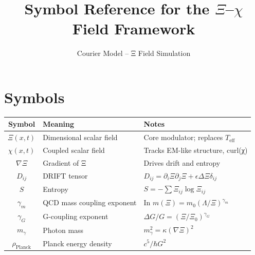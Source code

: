 \documentclass{article}
\begin{document}
\title{Symbol Reference for the $\Xi$--$\chi$ Field Framework}
\author{Courier Model – Ξ Field Simulation}
\maketitle

\section*{Symbols}

\begin{tabular}{|c|l|l|}
\hline
\textbf{Symbol} & \textbf{Meaning} & \textbf{Notes} \\
\hline
$\Xi(x,t)$ & Dimensional scalar field & Core modulator; replaces $T_{\text{eff}}$ \\
$\chi(x,t)$ & Coupled scalar field & Tracks EM-like structure, curl(χ) \\
$\nabla \Xi$ & Gradient of Ξ & Drives drift and entropy \\
$D_{ij}$ & DRIFT tensor & $D_{ij} = \partial_i \Xi \partial_j \Xi + \epsilon \Delta \Xi \delta_{ij}$ \\
$S$ & Entropy & $S = - \sum \Xi_{ij} \log \Xi_{ij}$ \\
$\gamma_m$ & QCD mass coupling exponent & In $m(\Xi) = m_0 (\Lambda/\Xi)^{\gamma_m}$ \\
$\gamma_G$ & G-coupling exponent & $\Delta G / G = (\Xi / \Xi_0)^{\gamma_G}$ \\
$m_\gamma$ & Photon mass & $m_\gamma^2 = \kappa (\nabla \Xi)^2$ \\
$\rho_{\text{Planck}}$ & Planck energy density & $c^5 / \hbar G^2$ \\
\hline
\end{tabular}
\end{document}
